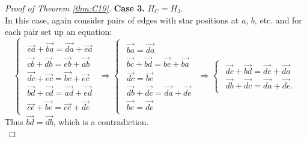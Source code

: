 \documentclass[11pt, a4paper]{article}
\begin{document}
\begin{proof}[Proof of Theorem \ref{thm:C10}]
{\bf Case 3.  } $H_C=H_3$.\\
In this case, again consider pairs of edges with star positions at $a$, $b$, etc. and for each pair set up an equation:
$$\begin{cases}
\begin{array}{c}
\overrightarrow{ea}+\overrightarrow{ba}=\overrightarrow{da}+\overrightarrow{ea}\\
\overrightarrow{cb}+\overrightarrow{db}=\overrightarrow{eb}+\overrightarrow{ab}\\
\overrightarrow{dc}+\overrightarrow{ec}=\overrightarrow{bc}+\overrightarrow{ec}\\
\overrightarrow{bd}+\overrightarrow{cd}=\overrightarrow{ad}+\overrightarrow{ed}\\
\overrightarrow{ce}+\overrightarrow{be}=\overrightarrow{ce}+\overrightarrow{de}
\end{array}
\end{cases}
\Longrightarrow
\begin{cases}
\begin{array}{c}
\overrightarrow{ba}=\overrightarrow{da}\\
\overrightarrow{bc}+\overrightarrow{bd}=\overrightarrow{be}+\overrightarrow{ba}\\
\overrightarrow{dc}=\overrightarrow{bc}\\
\overrightarrow{db}+\overrightarrow{dc}=\overrightarrow{da}+\overrightarrow{de}\\
\overrightarrow{be}=\overrightarrow{de}
\end{array}
\end{cases}
\Longrightarrow
\begin{cases}
\begin{array}{c}
\overrightarrow{dc}+\overrightarrow{bd}=\overrightarrow{de}+\overrightarrow{da}\\
\overrightarrow{db}+\overrightarrow{dc}=\overrightarrow{da}+\overrightarrow{de}.
\end{array}
\end{cases}$$
Thus $\overrightarrow{bd}=\overrightarrow{db}$, which is a contradiction.
\\


\end{proof}
\end{document}

